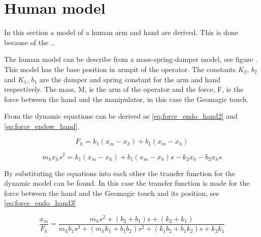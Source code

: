 \section{Human model}
In this section a model of a human arm and hand are derived. This is done because of the ..

The human model can be describe from a mass-spring-damper model, see figure . This model has the base position in armpit of the operator. The constants $K_2$, $b_2$ and $K_1$, $b_1$ are the damper and spring constant for the arm and hand respectively. The mass, M, is the arm of the operator and the force, F, is the force between the hand and the manipulator, in this case the Geomagic touch.




From  the dynamic equations can be derived as \eqref{eq:force_endo_hand2} and \eqref{eq:force_endow_hand}.

\begin{equation}
F_h = k_1(x_m-x_h)+b_1(x_m-x_h)
\label{eq:force_endo_hand2}
\end{equation}

\begin{equation}
m_hx_hs^2 = k_1(x_m-x_h)+b_1(x_m-x_h)s-k_2x_h-b_2x_hs
\label{eq:force_endow_hand}
\end{equation}

By substituting the equations into each other the transfer function for the dynamic model can be found. In this case the transfer function is made for the force between the hand and the Geomagic touch and its position, see \eqref{eq:force_endo_hand3}

\begin{equation}
\frac{x_m}{F_h} = \frac{m_hs^2+(b_2+b_1)s+(k_2+k_1)}{m_hb_1s^3+(m_hk_1+b_1b_2)s^2+(k_1b_2+b_1k_2)s+k_2k_1}
\label{eq:force_endo_hand3}
\end{equation}